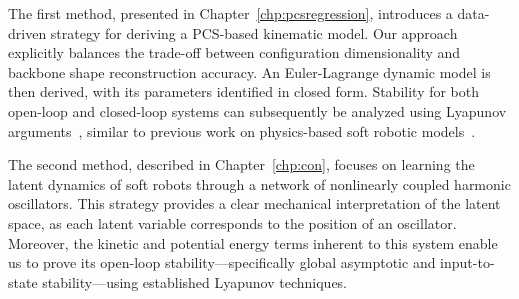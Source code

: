 The first method, presented in Chapter~\ref{chp:pcsregression}, introduces a data-driven strategy for deriving a \gls{PCS}-based kinematic model. Our approach explicitly balances the trade-off between configuration dimensionality and backbone shape reconstruction accuracy. An Euler-Lagrange dynamic model is then derived, with its parameters identified in closed form. Stability for both open-loop and closed-loop systems can subsequently be analyzed using Lyapunov arguments~\citep{khalil2002nonlinear}, similar to previous work on physics-based soft robotic models~\citep{della2023model}.

The second method, described in Chapter~\ref{chp:con}, focuses on learning the latent dynamics of soft robots through a network of nonlinearly coupled harmonic oscillators. This strategy provides a clear mechanical interpretation of the latent space, as each latent variable corresponds to the position of an oscillator. Moreover, the kinetic and potential energy terms inherent to this system enable us to prove its open-loop stability—specifically global asymptotic and input-to-state stability—using established Lyapunov techniques.

